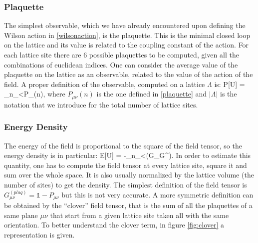 \subsubsection{Plaquette}
The simplest observable, which we have already encountered upon defining the Wilson action in \cref{wilsonaction}, is the plaquette. This is the minimal closed loop on the lattice and its value is related to the coupling constant of the action. For each lattice site there are 6 possible plaquettes to be computed, given all the combinations of euclidean indices. One can consider the average value of the plaquette on the lattice as an observable, related to the value of the action of the field. A proper definition of the observable, computed on a lattice $\Lambda$ is:
\beq
    P[U] = \sum_{n\in\Lambda}\sum_{\mu<\nu}P_{\mu\nu}(n),
\eeq
where $P_{\mu\nu}(n)$ is the one defined in \cref{plaquette} and $|\Lambda|$ is the notation that we introduce for the total number of lattice sites. \\

\subsubsection{Energy Density}
The energy of the field is proportional to the square of the field tensor, so the energy density is in particular:
\beq
    E[U] = -\sum_{n\in\Lambda}\sum_{\mu<\nu}\Tr(G_{\mu\nu}G^{\mu\nu}).
    \label{eq:energy}
\eeq
In order to estimate this quantity, one has to compute the field tensor at every lattice site, square it and sum over the whole space. It is also usually normalized by the lattice volume (the number of sites) to get the density. The simplest definition of the field tensor is $G_{\mu\nu}^{(plaq)} = \mathds{1} - P_{\mu\nu}$ but this is not very accurate. A more symmetric definition can be obtained by the ``clover'' field tensor, that is the sum of all the plaquettes of a same plane $\mu\nu$ that start from a given lattice site taken all with the same orientation. To better understand the clover term, in figure \cref{fig:clover} a representation is given.

